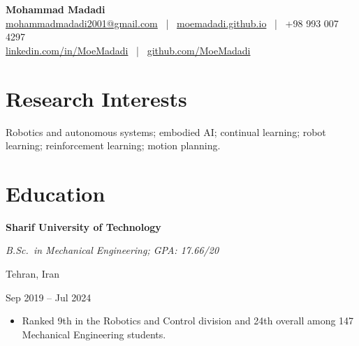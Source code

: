 \documentclass[10pt,letterpaper]{article}
\newcommand{\cvhead}[4]{%
  \par\vspace{3.5pt}%
  \noindent
  \begin{minipage}[t]{0.75\textwidth}
    \textbf{#1}\par
    \textit{#2}%
  \end{minipage}%
  \hfill
  \begin{minipage}[t]{0.23\textwidth}
    \raggedleft #3\par
    \raggedleft #4%
  \end{minipage}\par
  \vspace{1pt}%
}
\begin{document}
\begin{center}
  {\huge\bfseries Mohammad Madadi}\\[4pt]
  {\small
    \href{mailto:mohammadmadadi2001@gmail.com}{mohammadmadadi2001@gmail.com}
    \ | \
    \href{https://moemadadi.github.io}{moemadadi.github.io}
    \ | \
    +98 993 007 4297\\[2pt]
    \href{https://linkedin.com/in/MoeMadadi}{linkedin.com/in/MoeMadadi}
    \ | \
    \href{https://github.com/MoeMadadi}{github.com/MoeMadadi}
  }
\end{center}

\section{Research Interests}
Robotics and autonomous systems; embodied AI; continual learning; robot learning; reinforcement learning; motion planning.

\section{Education}
\cvhead{Sharif University of Technology}{B.Sc.\ in Mechanical Engineering; GPA: 17.66/20}{Tehran, Iran}{Sep 2019 -- Jul 2024}
\begin{itemize}
  \item Ranked 9th in the Robotics and Control division and 24th overall among 147 Mechanical Engineering students.
\end{itemize}
\end{document}
